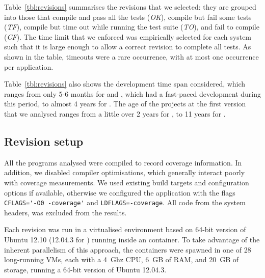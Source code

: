 Table~\ref{tbl:revisions} summarises the revisions that we selected:
they are grouped into those that compile and pass all the tests (\emph{OK}),
compile but fail some tests (\emph{TF}), compile but time out while running the
test suite (\emph{TO}), and fail to compile (\emph{CF}).  The time limit that
we enforced was empirically selected for each system such that it is large
enough to allow a correct revision to complete all tests. As shown in the
table, timeouts were a rare occurrence, with at most one occurrence per
application.

Table~\ref{tbl:revisions} also shows the development time span
considered, which ranges from only 5-6 months for \git and \redis,
which had a fast-paced development during this period, to almost 4
years for \memcached. The age of the projects at the first version
that we analysed ranges from a little over 2 years for \lighttpdtwo,
to 11 years for \binutils.

\subsection{Revision setup}

All the programs analysed were compiled to record coverage information. In
addition, we disabled compiler optimisations, which generally interact poorly
with coverage measurements. We used existing build targets and configuration
options if available, otherwise we configured the application with the flags
\lstinline`CFLAGS='-O0 -coverage'` and \lstinline`LDFLAGS=-coverage`. All code
from the system headers, \ie {} was excluded from the results.

Each revision was run in a virtualised environment based on 64-bit version of
Ubuntu 12.10 (12.04.3 for \git) running inside an \lxc container.  To take
advantage of the inherent parallelism of this approach, the containers were
spawned in one of 28 long-running \xen VMs, each with a 4~Ghz CPU, 6~GB of RAM,
and 20~GB of storage, running a 64-bit version of Ubuntu 12.04.3.

